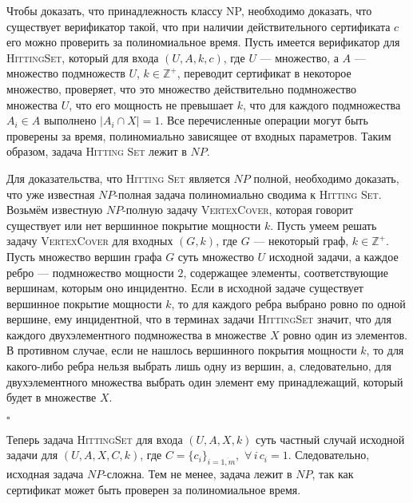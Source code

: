 \documentclass[10pt]{article}
\begin{document}
\medskip\par 
Чтобы доказать, что принадлежность классу NP, необходимо доказать, что существует
верификатор такой, что при наличии действительного сертификата $c$ его можно проверить
за полиномиальное время. Пусть имеется верификатор для \textsc{HittingSet}, который для входа $(U, A, k, c)$, где $U$ --- множество, а $A$ --- множество подмножеств $U$, $k\in\mathbb{Z}^+$, переводит сертификат в некоторое множество, проверяет, что это множество действительно подмножество множества $U$, что его мощность не превышает $k$, что для каждого подмножества $A_i \in A$ выполнено $|A_i\cap X| = 1$. Все перечисленные операции могут быть проверены за время, полиномиально зависящее от входных параметров. Таким образом, задача \textsc{Hitting Set} лежит в $NP$.
\medskip\par 
Для доказательства, что \textsc{Hitting Set} является $NP$ полной, необходимо доказать, что уже известная $NP$-полная задача полиномиально сводима к \textsc{Hitting Set}. Возьмём известную $NP$-полную задачу \textsc{VertexCover}, которая говорит существует или нет вершинное покрытие мощности $k$. Пусть умеем решать задачу \textsc{VertexCover} для входных $(G, k)$, где $G$ --- некоторый граф, $k\in\mathbb{Z}^+$. Пусть множество вершин графа $G$ суть множество $U$ исходной задачи, а каждое ребро --- подмножество мощности $2$, содержащее элементы, соответствующие вершинам, которым оно инцидентно. Если в исходной задаче существует вершинное покрытие мощности $k$, то для каждого ребра выбрано ровно по одной вершине, ему инцидентной, что в терминах задачи \textsc{HittingSet} значит, что для каждого двухэлементного подмножества в множестве $X$ ровно один из элементов. В противном случае, если не нашлось вершинного покрытия мощности $k$, то для какого-либо ребра нельзя выбрать лишь одну из вершин, а, следовательно, для двухэлементного множества выбрать один элемент ему принадлежащий, который будет в множестве $X$.
\begin{flushright}
$\square$
\end{flushright}
\par
Теперь задача \textsc{HittingSet} для входа $(U, A, X, k)$ суть частный случай исходной задачи для $(U, A, X, C, k)$, где $C=\{c_i\}_{i=\overline{1, m}},$ $\forall\, i\, c_i=1$. Следовательно, исходная задача $NP$-сложна. Тем не менее, задача лежит в $NP$, так как сертификат может быть проверен за полиномиальное время.
\end{document}
